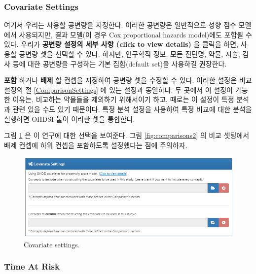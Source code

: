 \documentclass[11pt]{book}
\theoremstyle{definition}
\theoremstyle{definition}
\theoremstyle{definition}
\theoremstyle{remark}
\begin{document}
\subsubsection*{Covariate Settings}\label{covariate-settings}

여기서 우리는 사용할 공변량을 지정한다. 이러한 공변량은 일반적으로 성향
점수 모델에서 사용되지만, 결과 모델(이 경우 Cox proportional hazards
model)에도 포함될 수 있다. 우리가 \textbf{공변량 설정의 세부 사항 (click
to view details)} 을 클릭을 하면, 사용할 공변량 셋을 선택할 수 있다.
하지만, 인구학적 정보, 모든 진단명, 약물, 시술, 검사 등에 대한 공변량을
구성하는 기본 집합(default set)을 사용하길 권장한다.

\textbf{포함} 하거나 \textbf{배제} 할 컨셉을 지정하여 공변량 셋을 수정할
수 있다. 이러한 설정은 비교 설정의 절 \ref{ComparisonSettings} 에 있는
설정과 동일하다. 두 곳에서 이 설정이 가능한 이유는, 비교하는 약물들을
제외하기 위해서이기 하고, 때로는 이 설정이 특정 분석과 관련 있을 수도
있기 때문이다. 특정 분석 설정을 사용하여 특정 비교에 대한 분석을
실행하면 OHDSI 툴이 이러한 셋을 통합한다.

그림 \ref{fig:covariateSettings} 은 이 연구에 대한 선택을 보여준다. 그림
\ref{fig:comparisons2} 의 비교 셋팅에서 배제 컨셉에 하위 컨셉을
포함하도록 설정했다는 점에 주의하자.

\begin{figure}

{\centering \includegraphics[width=1\linewidth]{images/PopulationLevelEstimation/covariateSettings} 

}

\caption{Covariate settings.}\label{fig:covariateSettings}
\end{figure}

\subsubsection*{Time At Risk}\label{time-at-risk-2}
\end{document}
